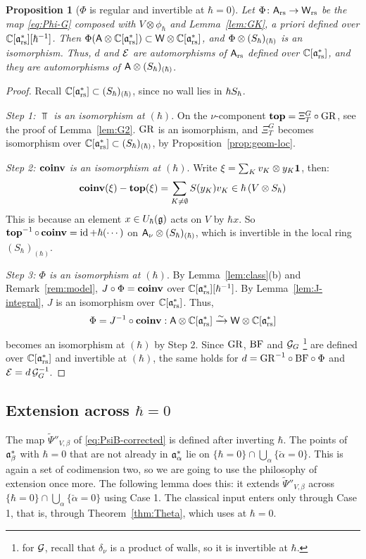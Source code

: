 \documentclass{article}
\theoremstyle{plain}
\newtheorem{proposition}[theorem]{Proposition}
\theoremstyle{definition}
\theoremstyle{remark}
\numberwithin{equation}{section}
\begin{document}
\begin{proposition}[$\Phi$ is regular and invertible at $\hbar=0$]\label{prop:Phi-integral}
Let $\Phi\colon\mathsf A_{\mathrm{rs}}\to\mathsf W_{\mathrm{rs}}$ be the map \eqref{eq:Phi-G} composed with $V\otimes\phi_\hbar$ and Lemma~\ref{lem:GK}, a priori defined over $\mathbb{C}[\mathfrak{a}^*_{\mathrm{rs}}][\hbar^{-1}]$. Then $\Phi(\mathsf A\otimes\mathbb{C}[\mathfrak{a}^*_{\mathrm{rs}}])\subset\mathsf W\otimes\mathbb{C}[\mathfrak{a}^*_{\mathrm{rs}}]$, and $\Phi\otimes(S_\hbar)_{(\hbar)}$ is an isomorphism. Thus, $d$ and $\mathcal E$ are automorphisms of $\mathsf A_{\mathrm{rs}}$ defined over $\mathbb{C}[\mathfrak{a}^*_{\mathrm{rs}}]$, and they are automorphisms of $\mathsf A\otimes(S_\hbar)_{(\hbar)}$.
\end{proposition}

\begin{proof}
Recall $\mathbb{C}[\mathfrak{a}^*_{\mathrm{rs}}]\subset(S_\hbar)_{(\hbar)}$, since no wall lies in $\hbar S_\hbar$.

\emph{Step 1: $\Top$ is an isomorphism at $(\hbar)$}. On the $\nu$-component $\operatorname{\mathbf{top}}=\Xi^G_T\circ\mathrm{GR}$, see the proof of Lemma~\ref{lem:G2}. $\mathrm{GR}$ is an isomorphism, and $\Xi^G_T$ becomes isomorphism over $\mathbb{C}[\mathfrak{a}^*_{\mathrm{rs}}]\subset(S_\hbar)_{(\hbar)}$, by Proposition~\ref{prop:geom-loc}.

\emph{Step 2: $\operatorname{\mathbf{coinv}}$ is an isomorphism at $(\hbar)$}. Write $\xi=\sum_Kv_K\otimes y_K\mathbf 1$,  then:
\[
\operatorname{\mathbf{coinv}}(\xi)-\operatorname{\mathbf{top}}(\xi)=\sum_{K\neq\emptyset}S(y_K)v_K\in\hbar\,(V\otimes S_\hbar)
\]
This is because an element $x \in U_\hbar(\mathfrak{g})$ acts on $V$ by $\hbar x$. So $\operatorname{\mathbf{top}}^{-1}\circ\operatorname{\mathbf{coinv}}=\operatorname{id}+\hbar(\cdots)$ on $\mathsf A_\nu\otimes(S_\hbar)_{(\hbar)}$, which is invertible in the local ring $(S_\hbar)_{(\hbar)}$.

\emph{Step 3: $\Phi$ is an isomorphism at $(\hbar)$}. By Lemma~\ref{lem:class}(b) and Remark~\ref{rem:model}, $J\circ\Phi=\operatorname{\mathbf{coinv}}$ over $\mathbb{C}[\mathfrak{a}^*_{\mathrm{rs}}][\hbar^{-1}]$. By Lemma~\ref{lem:J-integral}, $J$ is an isomorphism over $\mathbb{C}[\mathfrak{a}^*_{\mathrm{rs}}]$. Thus, 
\[
\Phi=J^{-1}\circ\operatorname{\mathbf{coinv}}: \mathsf A\otimes\mathbb{C}[\mathfrak{a}^*_{\mathrm{rs}}] \xrightarrow{\sim} \mathsf W\otimes\mathbb{C}[\mathfrak{a}^*_{\mathrm{rs}}]
\]
becomes an isomorphism at $(\hbar)$ by Step 2. Since $\mathrm{GR}$, $\mathrm{BF}$ and $\mathcal G_G$ \footnote{for $\mathcal G$, recall that $\delta_\nu$ is a product of walls, so it is invertible at $\hbar$.} are defined over $\mathbb{C}[\mathfrak{a}^*_{\mathrm{rs}}]$ and invertible at $(\hbar)$, the same holds for $d=\mathrm{GR}^{-1}\circ\mathrm{BF}\circ\Phi$ and $\mathcal E=d\,\mathcal G_G^{-1}$.
\end{proof}

\subsection{Extension across \texorpdfstring{$\hbar=0$}{hbar=0}}\label{app:extension}
The map $\widetilde\Psi''_{V,\beta}$ of \eqref{eq:PsiB-corrected} is defined after inverting $\hbar$. The points of $\mathfrak{a}^*_{\beta}$ with $\hbar=0$ that are not already in $\mathfrak{a}^*_{\alpha}$ lie on $\{\hbar=0\}\cap\bigcup_\alpha\{\check\alpha=0\}$. This is again a set of codimension two, so we are going to use the philosophy of extension once more. The following lemma does this: it extends $\widetilde\Psi''_{V,\beta}$ across $\{\hbar=0\}\cap\bigcup_\alpha\{\check\alpha=0\}$ using Case 1. The classical input enters only through Case 1, that is, through Theorem~\ref{thm:Theta}, which uses \cite[Proposition 3.4.12]{macerato2023leviequivariantrestrictionsphericalperverse} at $\hbar=0$.
\end{document}

